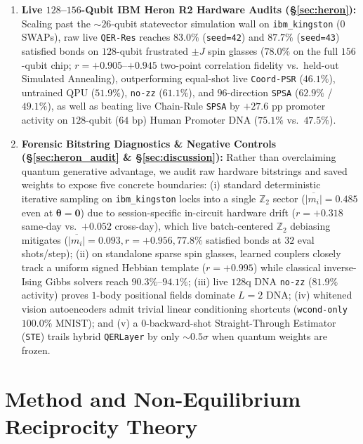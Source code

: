 \documentclass[11pt]{article}
\begin{document}
\begin{enumerate}[leftmargin=1.4em,itemsep=2pt,topsep=2pt]
  \item \textbf{Live $128$--$156$-Qubit IBM Heron R2 Hardware Audits (\S\ref{sec:heron}):} Scaling past the $\sim 26$-qubit statevector simulation wall on \texttt{ibm\_kingston} ($0$ SWAPs), raw live \texttt{QER-Res} reaches $83.0\%$ (\texttt{seed=42}) and $87.7\%$ (\texttt{seed=43}) satisfied bonds on $128$-qubit frustrated $\pm J$ spin glasses ($78.0\%$ on the full $156$-qubit chip; $r{=}+0.905$--$+0.945$ two-point correlation fidelity vs.\ held-out Simulated Annealing), outperforming equal-shot live \texttt{Coord-PSR} ($46.1\%$), untrained QPU ($51.9\%$), \texttt{no-zz} ($61.1\%$), and $96$-direction \texttt{SPSA} ($62.9\%$ / $49.1\%$), as well as beating live Chain-Rule \texttt{SPSA} by $+27.6\text{ pp}$ promoter activity on $128$-qubit ($64\text{ bp}$) Human Promoter DNA ($75.1\%$ vs.\ $47.5\%$).
  \item \textbf{Forensic Bitstring Diagnostics \& Negative Controls (\S\ref{sec:heron_audit} \& \S\ref{sec:discussion}):} Rather than overclaiming quantum generative advantage, we audit raw hardware bitstrings and saved weights to expose five concrete boundaries: (i) standard deterministic iterative sampling on \texttt{ibm\_kingston} locks into a single $\mathbb{Z}_2$ sector ($\overline{|m_i|}{=}0.485$ even at $\boldsymbol{\theta}{=}\mathbf{0}$) due to session-specific in-circuit hardware drift ($r{=}+0.318$ same-day vs.\ $+0.052$ cross-day), which live batch-centered $\mathbb{Z}_2$ debiasing mitigates ($\overline{|m_i|}{=}0.093, r{=}+0.956, 77.8\%$ satisfied bonds at $32$ eval shots/step); (ii) on standalone sparse spin glasses, learned couplers closely track a uniform signed Hebbian template ($r{=}+0.995$) while classical inverse-Ising Gibbs solvers reach $90.3\%$--$94.1\%$; (iii) live $128$q DNA \texttt{no-zz} ($81.9\%$ activity) proves $1$-body positional fields dominate $L{=}2$ DNA; (iv) whitened vision autoencoders admit trivial linear conditioning shortcuts (\texttt{wcond-only} $100.0\%$ MNIST); and (v) a $0$-backward-shot Straight-Through Estimator (\texttt{STE}) trails hybrid \texttt{QERLayer} by only $\sim 0.5\sigma$ when quantum weights are frozen.
\end{enumerate}

\section{Method and Non-Equilibrium Reciprocity Theory}
\label{sec:method}
\end{document}
